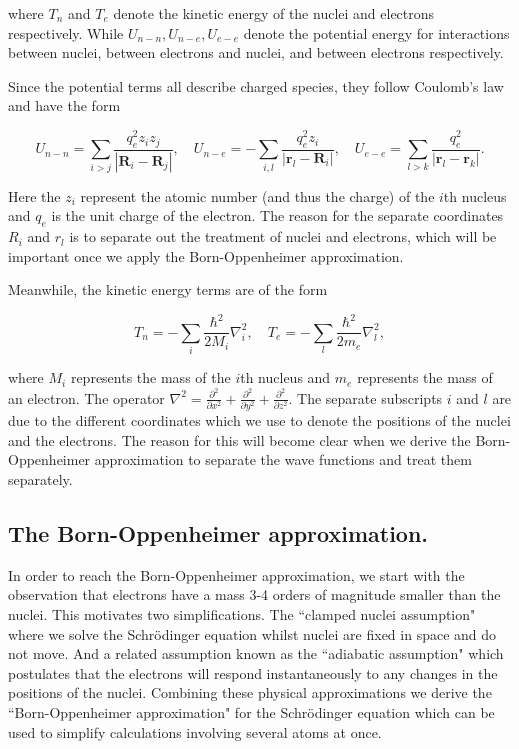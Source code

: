 where $T_n$ and $T_e$ denote the kinetic energy of the nuclei and electrons respectively. While $U_{n-n}, U_{n-e}, U_{e-e}$ denote the potential energy for interactions between nuclei, between electrons and nuclei, and between electrons respectively.

Since the potential terms all describe charged species, they follow Coulomb's law and have the form

\begin{equation}
	U_{n-n} = \sum_{i>j} \frac{q_e^2 z_i z_j }{|\textbf{R}_i-\textbf{R}_j|},\quad U_{n-e} = -\sum_{i,l} \frac{q_e^2 z_i }{|\textbf{r}_l-\textbf{R}_i|},\quad  U_{e-e}  = \sum_{l>k} \frac{q_e^2 }{|\textbf{r}_l-\textbf{r}_k|}.
\end{equation}

Here the $z_i$ represent the atomic number (and thus the charge) of the $i$th nucleus and $q_e$ is the unit charge of the electron. The reason for the separate coordinates $R_i$ and $r_l$ is to separate out the treatment of nuclei and electrons, which will be important once we apply the Born-Oppenheimer approximation.

Meanwhile, the kinetic energy terms are of the form 

\begin {equation}
T_n = - \sum_i \frac{\hbar^2}{2M_i} \nabla_i ^2,\quad  T_e = - \sum_l \frac{\hbar^2}{2m_e} \nabla_l ^2,
\end {equation}

where $M_i$ represents the mass of the $i$th nucleus and $m_e$ represents the mass of an electron. The operator $\nabla^2 = \frac{\partial^2}{\partial x^2} + \frac{\partial^2 }{\partial y^2} + \frac{\partial^2}{\partial z^2} $. The separate subscripts $i$ and $l$ are due to the different coordinates which we use to denote the positions of the nuclei and the electrons. The reason for this will become clear when we derive the Born-Oppenheimer approximation to separate the wave functions and treat them separately.

\subsection{The Born-Oppenheimer approximation.}
\label{born-oppenheimer}
In order to reach the Born-Oppenheimer approximation, we start with the observation that electrons have a mass 3-4 orders of magnitude smaller than the nuclei. This motivates two simplifications. The ``clamped nuclei assumption" where we solve the Schr\"odinger equation whilst nuclei are fixed in space and do not move. And a related assumption known as the ``adiabatic assumption" which postulates that the electrons will respond instantaneously to any changes in the positions of the nuclei. Combining these physical approximations we derive the ``Born-Oppenheimer approximation" for the Schr\"odinger equation which can be used to simplify calculations involving several atoms at once. 

